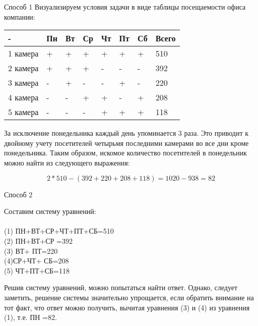 \solutionSection
Способ 1
Визуализируем условия задачи в виде таблицы посещаемости офиса компании:

\begin{tabular}{ | l | l | l | l | l | l | l | l |}
\hline
  -      & Пн & Вт & Ср & Чт & Пт & Сб & Всего \\ \hline
1 камера & + & + & + & + & + & + & 510 \\
2 камера & + & + & + & - & - & - & 392 \\
3 камера & - & + & - & - & + & - & 220 \\
4 камера & - & - & + & + & - & + & 208 \\
5 камера & - & - & - & + & + & + & 118 \\
\hline
\end{tabular}

За исключение понедельника каждый день упоминается 3 раза. Это приводит к двойному учету посетителей четырьмя последними камерами во все дни кроме понедельника. Таким образом, искомое количество посетителей в понедельник можно найти из следующего выражения:

\begin{displaymath}
2*510-(392+220+208+118)=1020-938=82
\end{displaymath}

Способ 2

Составим систему уравнений:
\\
\\
\eqno(1) ПН+ВТ+СР+ЧТ+ПТ+СБ=510 \\
\eqno(2) ПН+ВТ+СР =392 \\
\eqno(3) ВТ+ ПТ=220 \\
\eqno(4)СР+ЧТ+ СБ=208 \\
\eqno(5) ЧТ+ПТ+СБ=118 

Решив систему уравнений, можно попытаться найти ответ. Однако, следует заметить, решение системы значительно упрощается, если обратить внимание на тот факт, что ответ можно получить, вычитая уравнения (3) и (4) из уравнения (1), т.е. ПН =82.
